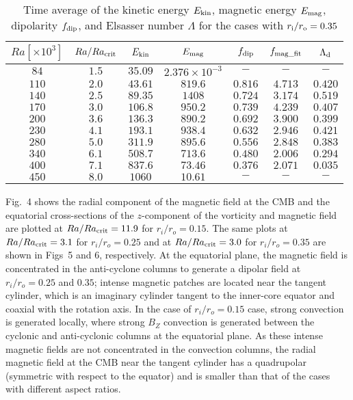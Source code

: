  \begin{table*}
\caption{Time average of the kinetic energy $E_{\rm kin}$, magnetic energy $E_{\rm mag}$, dipolarity $f_{\rm dip}$, and Elsasser number $\Lambda$ for the cases with $r_{\rm i}/r_{\rm o} = 0.35$}
  \begin{tabular}{ccccccc}
    \hline
     $Ra[\times 10^3]$  &  $Ra/Ra_{\rm crit}$&  $E_{\rm kin}$  &  $E_{\rm mag}$ & $f_{\rm dip}$ & $f_{\rm mag\_fit}$ & $\Lambda_{\rm d}$\\
    \hline \hline
      $84$    & $1.5$ &  $35.09$ & $2.376 \times 10^{-3}$ & $-$ & $-$ & $-$\\
     $110$  & $2.0$ &  $43.61$ & $819.6$ & $0.816$ & $4.713$ & $0.420$\\
     $140$  & $2.5$ &  $89.35$ & $1408$ & $0.724$ & $3.174$ & $0.519$\\
     $170$  & $3.0$ &  $106.8$ & $950.2$ & $0.739$ & $4.239$ & $0.407$\\
     $200$  & $3.6$ &  $136.3$ & $890.2$ & $0.692$ & $3.900$ & $0.399$\\
     $230$  & $4.1$ &  $193.1$ & $938.4$ & $0.632$ & $2.946$ & $0.421$\\
     $280$  & $5.0$ &  $311.9$ & $895.6$ & $0.556$ & $2.848$ & $0.383$\\
     $340$  & $6.1$ &  $508.7$ & $713.6$ & $0.480$ & $2.006$ & $0.294$\\
     $400$  & $7.1$ &  $837.6$ & $73.46$ & $0.376$ & $2.071$ & $0.035$\\
     $450$  & $8.0$ &  $1060$ & $10.61$ & $-$ & $-$ & $-$\\
    \hline
  \end{tabular}
\label{table:Summary_35}
 \end{table*}
%
Fig.~4 shows the radial component of the magnetic field at the CMB and the equatorial cross-sections of the $z$-component of the vorticity and magnetic field are plotted at $Ra/Ra_{\rm crit} = 11.9$ for $r_i/r_o = 0.15$. 
The same plots at $Ra/Ra_{\rm crit} = 3.1$ for $r_i/r_o = 0.25$ and at $Ra/Ra_{\rm crit} = 3.0$ for $r_i/r_o = 0.35$ are shown in Figs~5 and 6, respectively. 
At the equatorial plane, the magnetic field is concentrated in the anti-cyclone columns to generate a dipolar field at $r_i/r_o = 0.25$ and $0.35$; intense magnetic patches are located near the tangent cylinder, which is an imaginary cylinder tangent to the inner-core equator and coaxial with the rotation axis. 
In the case of $r_i/r_o = 0.15$ case, strong convection is generated locally, where strong $B_Z$ convection is generated between the cyclonic and anti-cyclonic columns at the equatorial plane.
As these intense magnetic fields are not concentrated in the convection columns, the radial magnetic field at the CMB near the tangent cylinder has a quadrupolar (symmetric with respect to the equator) and is smaller than that of the cases with different aspect ratios.
%
%